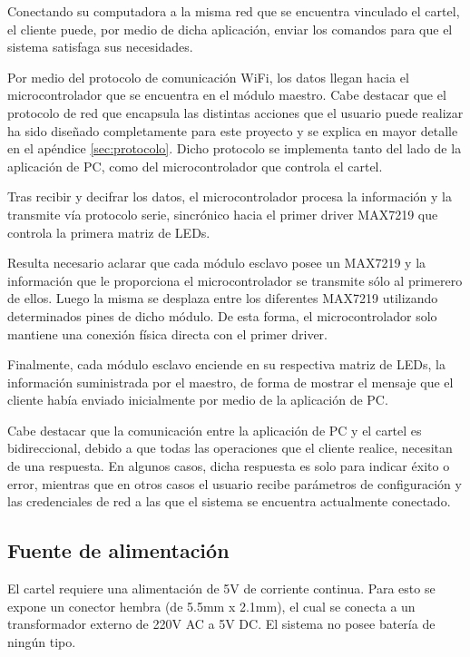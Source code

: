 Conectando su computadora a la misma red que se encuentra vinculado el cartel, el cliente puede, por medio de dicha aplicación, enviar los comandos para que el sistema satisfaga sus necesidades.

Por medio del protocolo de comunicación WiFi, los datos llegan hacia el microcontrolador que se encuentra en el módulo maestro. Cabe destacar que el protocolo de red que encapsula las distintas acciones que el usuario puede realizar ha sido diseñado completamente para este proyecto y se explica en mayor detalle en el apéndice \ref{sec:protocolo}.
Dicho protocolo se implementa tanto del lado de la aplicación de PC, como del microcontrolador que controla el cartel.

Tras recibir y decifrar los datos, el microcontrolador procesa la información y la transmite vía protocolo serie, sincrónico hacia el primer driver MAX7219 que controla la primera matriz de LEDs.

Resulta necesario aclarar que cada módulo esclavo posee un MAX7219 y la información que le proporciona el microcontrolador se transmite sólo al primerero de ellos. Luego la misma se desplaza entre los diferentes MAX7219 utilizando determinados pines de dicho módulo.
De esta forma, el microcontrolador solo mantiene una conexión física directa con el primer driver.

Finalmente, cada módulo esclavo enciende en su respectiva matriz de LEDs, la información suministrada por el maestro, de forma de mostrar el mensaje que el cliente había enviado inicialmente por medio de la aplicación de PC.

Cabe destacar que la comunicación entre la aplicación de PC y el cartel es bidireccional, debido a que todas las operaciones que el cliente realice, necesitan de una respuesta.
En algunos casos, dicha respuesta es solo para indicar éxito o error, mientras que en otros casos el usuario recibe parámetros de configuración y las credenciales de red a las que el sistema se encuentra actualmente conectado.

\subsection{Fuente de alimentación}
El cartel requiere una alimentación de 5V de corriente continua. Para esto se expone un conector hembra (de 5.5mm x 2.1mm), el cual se conecta a un transformador externo de 220V AC a 5V DC. El sistema no posee batería de ningún tipo.

